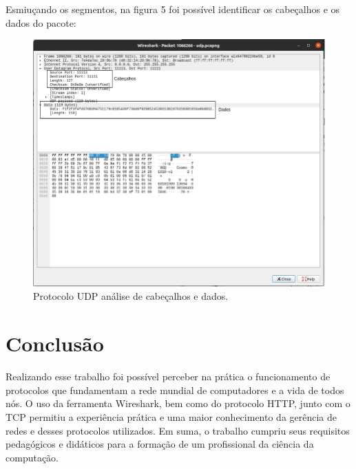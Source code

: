 \documentclass[12pt]{article}
\begin{document}
Esmiuçando os segmentos, na figura 5 foi possível identificar os cabeçalhos e os dados do pacote:
\begin{figure}[H]
    \centering
    \includegraphics[width=\linewidth]{header_data.png}
    \caption{Protocolo UDP análise de cabeçalhos e dados.}
\end{figure}

\section{Conclusão}

Realizando esse trabalho foi possível perceber na prática o funcionamento de protocolos que fundamentam a rede mundial de computadores e a vida de todos nós. O uso da ferramenta Wireshark, bem como do protocolo HTTP, junto com o TCP permitiu a experiência prática e uma maior conhecimento da gerência de redes e desses protocolos utilizados. Em suma, o trabalho cumpriu seus requisitos pedagógicos e didáticos para a formação de um profissional da ciência da computação.

\nocite{*}
\medskip



\end{document}
